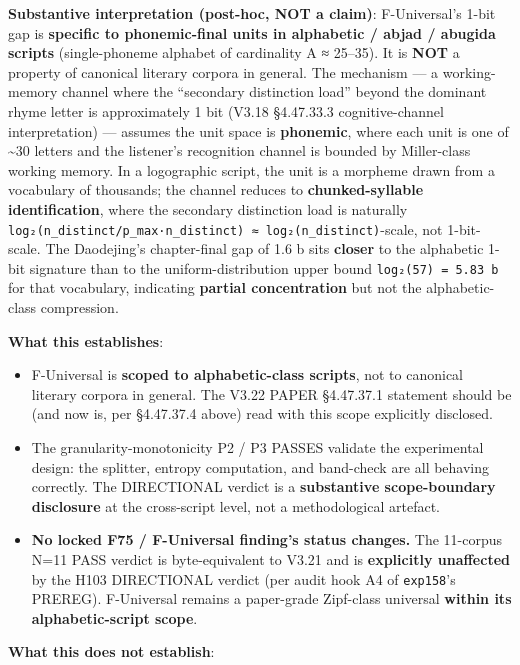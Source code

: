 \documentclass[
]{article}
\providecommand{\tightlist}{%
  \setlength{\itemsep}{0pt}\setlength{\parskip}{0pt}}
\begin{document}
\textbf{Substantive interpretation (post-hoc, NOT a claim)}:
F-Universal's 1-bit gap is \textbf{specific to phonemic-final units in
alphabetic / abjad / abugida scripts} (single-phoneme alphabet of
cardinality A ≈ 25--35). It is \textbf{NOT} a property of canonical
literary corpora in general. The mechanism --- a working-memory channel
where the ``secondary distinction load'' beyond the dominant rhyme
letter is approximately 1 bit (V3.18 §4.47.33.3 cognitive-channel
interpretation) --- assumes the unit space is \textbf{phonemic}, where
each unit is one of \textasciitilde30 letters and the listener's
recognition channel is bounded by Miller-class working memory. In a
logographic script, the unit is a morpheme drawn from a vocabulary of
thousands; the channel reduces to \textbf{chunked-syllable
identification}, where the secondary distinction load is naturally
\texttt{log₂(n\_distinct/p\_max·n\_distinct)\ ≈\ log₂(n\_distinct)}-scale,
not 1-bit-scale. The Daodejing's chapter-final gap of 1.6 b sits
\textbf{closer} to the alphabetic 1-bit signature than to the
uniform-distribution upper bound \texttt{log₂(57)\ =\ 5.83\ b} for that
vocabulary, indicating \textbf{partial concentration} but not the
alphabetic-class compression.

\textbf{What this establishes}:

\begin{itemize}
\tightlist
\item
  F-Universal is \textbf{scoped to alphabetic-class scripts}, not to
  canonical literary corpora in general. The V3.22 PAPER §4.47.37.1
  statement should be (and now is, per §4.47.37.4 above) read with this
  scope explicitly disclosed.
\item
  The granularity-monotonicity P2 / P3 PASSES validate the experimental
  design: the splitter, entropy computation, and band-check are all
  behaving correctly. The DIRECTIONAL verdict is a \textbf{substantive
  scope-boundary disclosure} at the cross-script level, not a
  methodological artefact.
\item
  \textbf{No locked F75 / F-Universal finding's status changes.} The
  11-corpus N=11 PASS verdict is byte-equivalent to V3.21 and is
  \textbf{explicitly unaffected} by the H103 DIRECTIONAL verdict (per
  audit hook A4 of \texttt{exp158}'s PREREG). F-Universal remains a
  paper-grade Zipf-class universal \textbf{within its alphabetic-script
  scope}.
\end{itemize}

\textbf{What this does not establish}:
\end{document}
